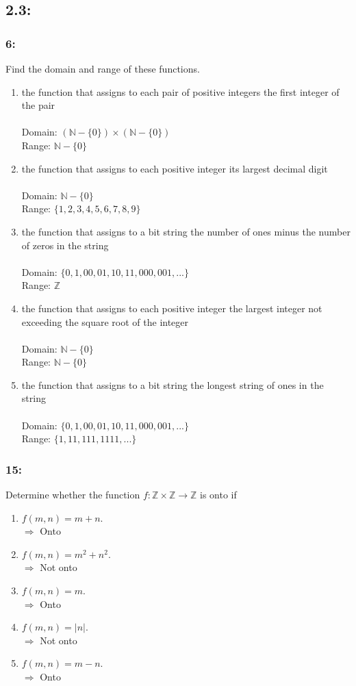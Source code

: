 \documentclass[12pt,en,a4paper]{article}
\begin{document}
	\subsection*{2.3:}
	\subsubsection*{6:}
	Find the domain and range of these functions.
	\begin{enumerate}[label=\textbf{\alph*)}]
		\item the function that assigns to each pair of positive integers the first integer of the pair\\\\
		Domain: $(\mathbb{N}-\{0\})\times(\mathbb{N}-\{0\})$\\
		Range: $\mathbb{N}-\{0\}$
		\item the function that assigns to each positive integer its largest decimal digit\\\\
		Domain: $\mathbb{N}-\{0\}$\\
		Range: $\{1,2,3,4,5,6,7,8,9\}$
		\item the function that assigns to a bit string the number of ones minus the number of zeros in the string\\\\
		Domain: $\{0,1,00,01,10,11,000,001,...\}$\\
		Range: $\mathbb{Z}$
		\item the function that assigns to each positive integer the largest integer not exceeding the square root of the integer\\\\
		Domain: $\mathbb{N}-\{0\}$\\
		Range: $\mathbb{N}-\{0\}$
		\item the function that assigns to a bit string the longest string of ones in the string\\\\
		Domain: $\{0,1,00,01,10,11,000,001,...\}$\\
		Range: $\{1,11,111,1111,...\}$
	\end{enumerate}
	\subsubsection*{15:}
	Determine whether the function $f:\mathbb{Z}\times\mathbb{Z}\rightarrow\mathbb{Z}$ is onto if
	\begin{enumerate}[label=\textbf{\alph*)}]
		\item $f(m,n)=m+n$.\\
		$\Rightarrow$ Onto
		\item $f(m,n)=m^2+n^2$.\\
		$\Rightarrow$ Not onto
		\item $f(m,n)=m$.\\
		$\Rightarrow$ Onto
		\item $f(m,n)=|n|$.\\
		$\Rightarrow$ Not onto
		\item $f(m,n)=m-n$.\\
		$\Rightarrow$ Onto
	\end{enumerate}
\end{document}

